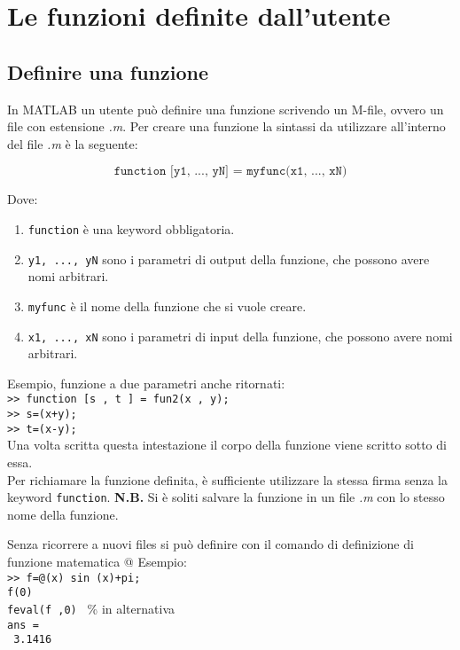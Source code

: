 \chapter{Le funzioni definite dall'utente}
\section{Definire una funzione}
In MATLAB un utente può definire una funzione scrivendo un M-file, ovvero un file con estensione \textit{.m}.
Per creare una funzione la sintassi da utilizzare all'interno del file \textit{.m} è la seguente:

$$  \texttt{function [y1, ..., yN] = myfunc(x1, ..., xN)}$$

Dove:
\begin{enumerate}
	\item	\texttt{function} è una keyword obbligatoria.
	\item	\texttt{y1, ..., yN} sono i parametri di output della funzione, che possono avere nomi arbitrari.
	\item 	\texttt{myfunc} è il nome della funzione che si vuole creare.
	\item	\texttt{x1, ..., xN} sono i parametri di input della funzione, che possono avere nomi arbitrari. 
\end{enumerate}

Esempio, funzione a due parametri anche ritornati:\\

\texttt{>> function [s , t ] = fun2(x , y);} \\
\texttt{>> s=(x+y);} \\
\texttt{>> t=(x-y);} \\ 

Una volta scritta questa intestazione il corpo della funzione viene scritto sotto di essa. \\
Per richiamare la funzione definita, è sufficiente utilizzare la stessa firma senza la keyword \texttt{function}. 
\break \break
\textbf{N.B.} Si è soliti salvare la funzione in un file \textit{.m} con lo stesso nome della funzione. 

Senza ricorrere a nuovi files si può definire con il comando di definizione di funzione matematica @
Esempio: \\
\texttt{>> f=@(x) sin (x)+pi;} \\
\texttt{f(0) } \\
\texttt{feval(f ,0) } \% in alternativa \\
\texttt{ans = } \\
\texttt{\hspace{0.5cm} 3.1416} \break